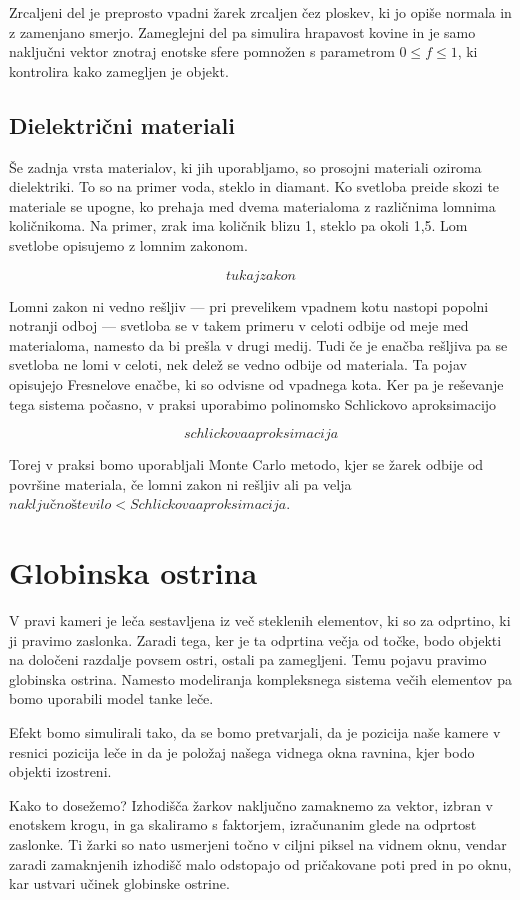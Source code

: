 \documentclass[12pt, a4paper]{article}
\begin{document}
Zrcaljeni del je preprosto vpadni žarek zrcaljen čez ploskev, ki jo opiše normala in z zamenjano smerjo.
Zameglejni del pa simulira hrapavost kovine in je samo naključni vektor znotraj enotske sfere pomnožen
s parametrom $0 \leq f \leq 1$, ki kontrolira kako zamegljen je objekt.

\subsection{Dielektrični materiali}
Še zadnja vrsta materialov, ki jih uporabljamo, so prosojni materiali oziroma dielektriki. To so na primer voda,
steklo in diamant. Ko svetloba preide skozi te materiale se upogne, ko prehaja med dvema materialoma z
različnima lomnima količnikoma. Na primer, zrak ima količnik blizu 1, steklo pa okoli 1,5. Lom svetlobe opisujemo
z lomnim zakonom.

$$
	tukaj zakon
$$


Lomni zakon ni vedno rešljiv — pri prevelikem vpadnem kotu nastopi popolni notranji odboj — svetloba se v takem
primeru v celoti odbije od meje med materialoma, namesto da bi prešla v drugi medij. Tudi če je enačba rešljiva
pa se svetloba ne lomi v celoti, nek delež se vedno odbije od materiala. Ta pojav opisujejo Fresnelove enačbe, ki
so odvisne od vpadnega kota. Ker pa je reševanje tega sistema počasno, v praksi uporabimo polinomsko Schlickovo
aproksimacijo

$$
	schlickova aproksimacija
$$

Torej v praksi bomo uporabljali Monte Carlo metodo, kjer se žarek odbije od površine materiala, če lomni zakon
ni rešljiv ali pa velja $naključno število < Schlickova aproksimacija$.

\section{Globinska ostrina}

V pravi kameri je leča sestavljena iz več steklenih elementov, ki so za odprtino, ki ji pravimo zaslonka.
Zaradi tega, ker je ta odprtina večja od točke, bodo objekti na določeni razdalje povsem ostri, ostali pa
zamegljeni. Temu pojavu pravimo globinska ostrina. Namesto modeliranja kompleksnega sistema večih elementov
pa bomo uporabili model tanke leče.


Efekt bomo simulirali tako, da se bomo pretvarjali, da je pozicija naše kamere v resnici pozicija leče in
da je položaj našega vidnega okna ravnina, kjer bodo objekti izostreni.

Kako to dosežemo? Izhodišča žarkov naključno zamaknemo za vektor, izbran v enotskem krogu, in ga skaliramo s
faktorjem, izračunanim glede na odprtost zaslonke. Ti žarki so nato usmerjeni točno v ciljni piksel na vidnem
oknu, vendar zaradi zamaknjenih izhodišč malo odstopajo od pričakovane poti pred in po oknu, kar ustvari učinek
globinske ostrine.

\printbibliography
\end{document}
